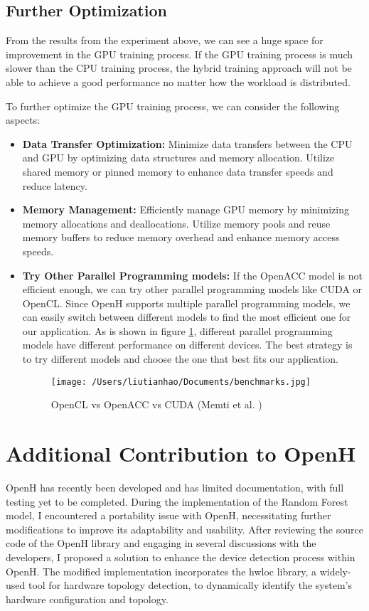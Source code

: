 \documentclass[13pt]{article}
\begin{document}
\subsection{Further Optimization}
From the results from the experiment above, we can see a huge space for improvement in the GPU training process. 
If the GPU training process is much slower than the CPU training process, the hybrid training approach will not be able to achieve a good performance no matter how the workload is distributed.

To further optimize the GPU training process, we can consider the following aspects:
\begin{itemize}
    \item \textbf{Data Transfer Optimization:} 
    Minimize data transfers between the CPU and GPU by optimizing data structures and memory allocation. 
    Utilize shared memory or pinned memory to enhance data transfer speeds and reduce latency.
    
    \item \textbf{Memory Management:} 
    Efficiently manage GPU memory by minimizing memory allocations and deallocations. 
    Utilize memory pools and reuse memory buffers to reduce memory overhead and enhance memory access speeds.
    
    \item \textbf{Try Other Parallel Programming models:}
    If the OpenACC model is not efficient enough, we can try other parallel programming models like CUDA or OpenCL.
    Since OpenH supports multiple parallel programming models, we can easily switch between different models to find the most efficient one for our application.
    As is shown in figure \ref{fig:benchmarks}, different parallel programming models have different performance on different devices.
    The best strategy is to try different models and choose the one that best fits our application.

    \begin{figure}[h!]
        \centering
        \texttt{[image: /Users/liutianhao/Documents/benchmarks.jpg]}
        \caption{OpenCL vs OpenACC vs CUDA (Memti et al. \cite{benchmark})}
        \label{fig:benchmarks}
    \end{figure}
\end{itemize}

\section{Additional Contribution to OpenH}
OpenH has recently been developed and has limited documentation, with full testing yet to be completed. 
During the implementation of the Random Forest model, I encountered a portability issue with OpenH, necessitating further modifications to improve its adaptability and usability. 
After reviewing the source code of the OpenH library and engaging in several discussions with the developers, I proposed a solution to enhance the device detection process within OpenH.
The modified implementation incorporates the hwloc library\cite{hwloc}, a widely-used tool for hardware topology detection, to dynamically identify the system's hardware configuration and topology.
\end{document}
